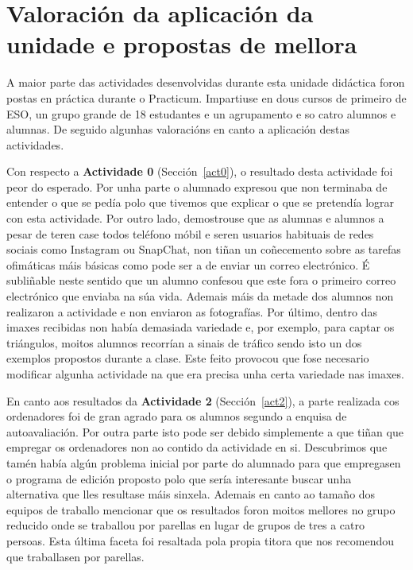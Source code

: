 
\section{Valoración da aplicación da unidade e propostas de mellora}
A maior parte das actividades desenvolvidas durante esta unidade didáctica foron postas en práctica durante o Practicum. Impartiuse en dous cursos de primeiro de ESO, un grupo grande de 18 estudantes e un agrupamento e so catro alumnos e alumnas. De seguido algunhas valoracións en canto a aplicación destas actividades.

Con respecto a \textbf{Actividade 0} (Sección~\ref{act0}), o resultado desta actividade foi peor do esperado. Por unha parte o alumnado expresou que non terminaba de entender o que se pedía polo que tivemos que explicar o que se pretendía lograr con esta actividade. Por outro lado, demostrouse que as alumnas e alumnos a pesar de teren case todos teléfono móbil e seren usuarios habituais de redes sociais como Instagram ou SnapChat, non tiñan un coñecemento sobre as tarefas ofimáticas máis básicas como pode ser a de enviar un correo electrónico. É subliñable neste sentido que un alumno confesou que este fora o primeiro correo electrónico que enviaba na súa vida. Ademais máis da metade dos alumnos non realizaron a actividade e non enviaron as fotografías. Por último, dentro das imaxes recibidas non había demasiada variedade e, por exemplo, para captar os triángulos, moitos alumnos recorrían a sinais de tráfico sendo isto un dos exemplos propostos durante a clase. Este feito provocou que fose necesario modificar algunha actividade na que era precisa unha certa variedade nas imaxes.

En canto aos resultados da \textbf{Actividade 2} (Sección~\ref{act2}), a parte realizada cos ordenadores foi de gran agrado para os alumnos segundo a enquisa de autoavaliación. Por outra parte isto pode ser debido simplemente a que tiñan que empregar os ordenadores non ao contido da actividade en si. Descubrimos que tamén había algún problema inicial por parte do alumnado para que empregasen o programa de edición proposto polo que sería interesante buscar unha alternativa que lles resultase máis sinxela. Ademais en canto ao tamaño dos equipos de traballo mencionar que os resultados foron moitos mellores no grupo reducido onde se traballou por parellas en lugar de grupos de tres a catro persoas. Esta última faceta foi resaltada pola propia titora que nos recomendou que traballasen por parellas.

